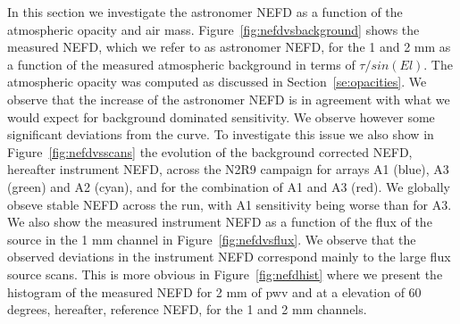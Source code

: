 In this section we investigate the astronomer NEFD as a function of the
atmospheric opacity and air mass. Figure~\ref{fig:nefdvsbackground} shows the
measured NEFD, which we refer to as astronomer NEFD, for the 1 and 2 mm as a
function of the measured atmospheric background in terms of $\tau/sin(El)$. The
atmospheric opacity was computed as discussed in Section~\ref{se:opacities}. We
observe that the increase of the astronomer NEFD is in agreement with what we
would expect for background dominated sensitivity. We observe however some
significant deviations from the curve. To investigate this issue we also show in
Figure~\ref{fig:nefdvsscans} the evolution of the background corrected NEFD,
hereafter instrument NEFD, across the N2R9 campaign for arrays A1 (blue), A3
(green) and A2 (cyan), and for the combination of A1 and A3 (red). We globally
obseve stable NEFD across the run, with A1 sensitivity being worse than for
A3. We also show the measured instrument NEFD as a function of the flux of the
source in the 1 mm channel in Figure~\ref{fig:nefdvsflux}. We observe that the
observed deviations in the instrument NEFD correspond mainly to the large flux
source scans. This is more obvious in Figure~\ref{fig:nefdhist} where we present
the histogram of the measured NEFD for 2 mm of pwv and at a elevation of 60
degrees, hereafter, reference NEFD, for the 1 and 2 mm channels.


